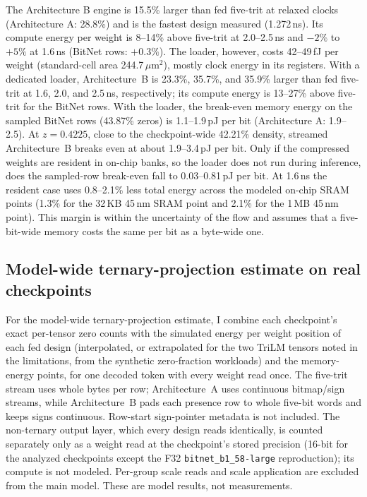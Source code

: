 \documentclass[11pt]{article}
\begin{document}
The Architecture B engine is 15.5\% larger than fed five-trit at relaxed
clocks (Architecture A: 28.8\%) and is the fastest design measured
(1.272\,ns). Its compute energy per weight is 8--14\% above five-trit at
2.0--2.5\,ns and $-2\%$ to $+5\%$ at 1.6\,ns (BitNet rows: $+0.3\%$). The
loader, however, costs 42--49\,fJ per weight (standard-cell area 244.7\,$\mu\mathrm{m}^2$), mostly clock
energy in its registers. With a dedicated loader, Architecture~B is 23.3\%, 35.7\%, and 35.9\% larger than fed five-trit at 1.6, 2.0, and 2.5\,ns, respectively; its compute energy is 13--27\% above five-trit for
the BitNet rows. With the loader, the break-even memory energy on the sampled BitNet rows
(43.87\% zeros) is 1.1--1.9\,pJ per bit (Architecture A: 1.9--2.5). At
$z=0.4225$, close to the checkpoint-wide 42.21\% density, streamed
Architecture~B breaks even at about 1.9--3.4\,pJ per bit. Only if the
compressed weights are resident in on-chip banks, so the loader does not
run during inference, does the sampled-row break-even fall to 0.03--0.81\,pJ
per bit. At 1.6\,ns the resident case uses 0.8--2.1\% less total energy
across the modeled on-chip SRAM points (1.3\% for the 32\,KB 45\,nm SRAM
point and 2.1\% for the 1\,MB 45\,nm point). This margin is within the uncertainty of the flow
and assumes that a five-bit-wide memory costs the same per bit as a
byte-wide one.

\subsection{Model-wide ternary-projection estimate on real checkpoints}

For the model-wide ternary-projection estimate, I combine each checkpoint's exact
per-tensor zero counts with the simulated energy per weight position of each
fed design (interpolated, or extrapolated for the two
TriLM tensors noted in the limitations, from the synthetic zero-fraction
workloads) and the memory-energy points, for one decoded
token with every weight read once. The five-trit stream uses whole bytes per
row; Architecture~A uses continuous bitmap/sign streams, while Architecture~B pads each presence row to whole five-bit words and keeps signs continuous. Row-start sign-pointer metadata
is not included. The non-ternary output layer, which every design reads identically, is counted separately only as a weight read at the checkpoint's stored precision (16-bit for the analyzed checkpoints except the F32 \texttt{bitnet\_b1\_58-large} reproduction); its compute is not modeled. Per-group scale reads and scale application are excluded from the main model. These are model results, not measurements.
\end{document}
